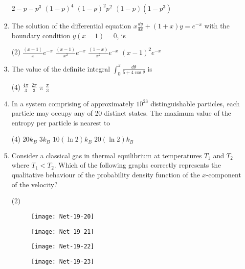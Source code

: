 \begin{enumerate}
\begin{tasks}
	\task[\textbf{a.}] $2-p-p^{3}$
	\task[\textbf{b.}] $(1-p)^{4}$
	\task[\textbf{c.}] $(1-p)^{2} p^{2}$
	\task[\textbf{d.}] $(1-p)\left(1-p^{3}\right)$
\end{tasks}
\item The solution of the differential equation $x \frac{d y}{d x}+(1+x) y=e^{-x}$ with the boundary condition $y(x=1)=0$, is
 \begin{tasks}(2)
	\task[\textbf{a.}]$\frac{(x-1)}{x} e^{-x}$
	\task[\textbf{b.}] $\frac{(x-1)}{x^{2}} e^{-x}$
	\task[\textbf{c.}] $\frac{(1-x)}{x^{2}} e^{-x}$
	\task[\textbf{d.}] $(x-1)^{2} e^{-x}$
\end{tasks}
\item The value of the definite integral $\int_{0}^{\pi} \frac{d \theta}{5+4 \cos \theta}$ is
 \begin{tasks}(4)
	\task[\textbf{a.}]$\frac{4 \pi}{3}$
	\task[\textbf{b.}] $\frac{2 \pi}{3}$
	\task[\textbf{c.}]$\pi$
	\task[\textbf{d.}]$\frac{\pi}{3}$ 
\end{tasks}
\item In a system comprising of approximately $10^{23}$ distinguishable particles, each particle may occupy any of 20 distinct states. The maximum value of the entropy per particle is nearest to
 \begin{tasks}(4)
	\task[\textbf{a.}] $20 k_{B}$
	\task[\textbf{b.}]$3 k_{B}$
	\task[\textbf{c.}]$10(\ln 2) k_{B}$
	\task[\textbf{d.}]$20(\ln 2) k_{B}$ 
\end{tasks}
\item  Consider a classical gas in thermal equilibrium at temperatures $T_{1}$ and $T_{2}$ where $T_{1}<T_{2}$. Which of the following graphs correctly represents the qualitative behaviour of the probability density function of the $x$-component of the velocity?
 \begin{tasks}(2)
	\task[\textbf{a.}]
	\begin{figure}[H]
		\centering
		\texttt{[image: Net-19-20]}
	\end{figure}
	\task[\textbf{b.}]
		\begin{figure}[H]
		\centering
		\texttt{[image: Net-19-21]}
	\end{figure}
	\task[\textbf{c.}]
		\begin{figure}[H]
		\centering
		\texttt{[image: Net-19-22]}
	\end{figure}
	\task[\textbf{d.}] 
		\begin{figure}[H]
		\centering
		\texttt{[image: Net-19-23]}

\end{figure}
\end{tasks}
\end{enumerate}
